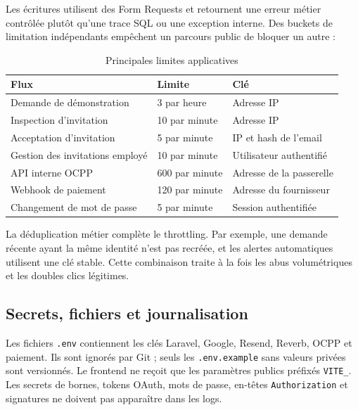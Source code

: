 Les écritures utilisent des Form Requests et retournent une erreur métier contrôlée
plutôt qu'une trace SQL ou une exception interne. Des buckets de limitation
indépendants empêchent un parcours public de bloquer un autre :

\begin{table}[H]
  \centering
  \caption{Principales limites applicatives}
  \label{tab:rate-limits}
  \begin{tabularx}{\textwidth}{|Y|p{3.1cm}|Y|}
    \hline
    \textbf{Flux} & \textbf{Limite} & \textbf{Clé}\\\hline

    Demande de démonstration & 3 par heure & Adresse IP\\\hline
    Inspection d'invitation & 10 par minute & Adresse IP\\\hline
    Acceptation d'invitation & 5 par minute & IP et hash de l'email\\\hline
    Gestion des invitations employé & 10 par minute & Utilisateur authentifié\\\hline
    API interne OCPP & 600 par minute & Adresse de la passerelle\\\hline
    Webhook de paiement & 120 par minute & Adresse du fournisseur\\\hline
    Changement de mot de passe & 5 par minute & Session authentifiée\\\hline

  \end{tabularx}
\end{table}

La déduplication métier complète le throttling. Par exemple, une demande récente
ayant la même identité n'est pas recréée, et les alertes automatiques utilisent une
clé stable. Cette combinaison traite à la fois les abus volumétriques et les doubles
clics légitimes.

\subsection{Secrets, fichiers et journalisation}

Les fichiers \texttt{.env} contiennent les clés Laravel, Google, Resend, Reverb,
OCPP et paiement. Ils sont ignorés par Git ; seuls les \texttt{.env.example} sans
valeurs privées sont versionnés. Le frontend ne reçoit que les paramètres publics
préfixés \texttt{VITE\_}. Les secrets de bornes, tokens OAuth, mots de passe,
en-têtes \texttt{Authorization} et signatures ne doivent pas apparaître dans les
logs.

